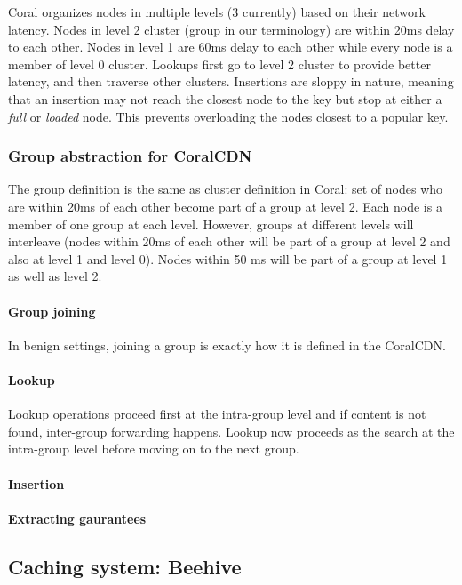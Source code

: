 Coral organizes nodes in multiple levels (3 currently) based on their network latency. Nodes in level 2 cluster (group in our terminology) are within 20ms delay to each other. Nodes in level 1 are 60ms delay to each other while every node is a member of level 0 cluster. Lookups first go to level 2 cluster to provide better latency, and then traverse other clusters. Insertions are sloppy in nature, meaning that an insertion may not reach the closest node to the key but stop at either a \textit{full} or \textit{loaded} node. This prevents overloading the nodes closest to a popular key.

\subsubsection{Group abstraction for CoralCDN}
The group definition is the same as cluster definition in Coral: set of nodes who are within 20ms of each other become part of a group at level 2. Each node is a member of one group at each level. However, groups at different levels will interleave (nodes within 20ms of each other will be part of a group at level 2 and also at level 1 and level 0). Nodes within 50 ms will be part of a group at level 1 as well as level 2.

\paragraph{Group joining}
In benign settings, joining a group is exactly how it is defined in the CoralCDN.

\paragraph{Lookup}
Lookup operations proceed first at the intra-group level and if content is not found, inter-group forwarding happens. Lookup now proceeds as the search at the intra-group level before moving on to the next group.

\paragraph{Insertion}

\paragraph{Extracting gaurantees}
 
\subsection{Caching system: Beehive} 
 
